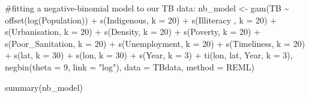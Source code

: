 \documentclass[
  letterpaper,
  DIV=11,
  numbers=noendperiod]{scrartcl}
\newenvironment{Shaded}{\begin{snugshade}}{\end{snugshade}}
\newcommand{\AttributeTok}[1]{\textcolor[rgb]{0.40,0.45,0.13}{#1}}
\newcommand{\CommentTok}[1]{\textcolor[rgb]{0.37,0.37,0.37}{#1}}
\newcommand{\DecValTok}[1]{\textcolor[rgb]{0.68,0.00,0.00}{#1}}
\newcommand{\FunctionTok}[1]{\textcolor[rgb]{0.28,0.35,0.67}{#1}}
\newcommand{\NormalTok}[1]{\textcolor[rgb]{0.00,0.23,0.31}{#1}}
\newcommand{\OtherTok}[1]{\textcolor[rgb]{0.00,0.23,0.31}{#1}}
\newcommand{\SpecialCharTok}[1]{\textcolor[rgb]{0.37,0.37,0.37}{#1}}
\newcommand{\StringTok}[1]{\textcolor[rgb]{0.13,0.47,0.30}{#1}}
\begin{document}
\begin{Shaded}
\begin{Highlighting}[]
\CommentTok{\#fitting a negative{-}binomial model to our TB data:}
\NormalTok{nb\_model }\OtherTok{\textless{}{-}} \FunctionTok{gam}\NormalTok{(TB }\SpecialCharTok{\textasciitilde{}} \FunctionTok{offset}\NormalTok{(}\FunctionTok{log}\NormalTok{(Population)) }\SpecialCharTok{+} \FunctionTok{s}\NormalTok{(Indigenous, }\AttributeTok{k =} \DecValTok{20}\NormalTok{) }\SpecialCharTok{+} \FunctionTok{s}\NormalTok{(Illiteracy , }\AttributeTok{k =} \DecValTok{20}\NormalTok{) }\SpecialCharTok{+} \FunctionTok{s}\NormalTok{(Urbanisation, }\AttributeTok{k =} \DecValTok{20}\NormalTok{) }\SpecialCharTok{+} \FunctionTok{s}\NormalTok{(Density, }\AttributeTok{k =} \DecValTok{20}\NormalTok{) }\SpecialCharTok{+} \FunctionTok{s}\NormalTok{(Poverty, }\AttributeTok{k =} \DecValTok{20}\NormalTok{) }\SpecialCharTok{+} \FunctionTok{s}\NormalTok{(Poor\_Sanitation, }\AttributeTok{k =} \DecValTok{20}\NormalTok{) }\SpecialCharTok{+} \FunctionTok{s}\NormalTok{(Unemployment, }\AttributeTok{k =} \DecValTok{20}\NormalTok{) }\SpecialCharTok{+} \FunctionTok{s}\NormalTok{(Timeliness, }\AttributeTok{k =} \DecValTok{20}\NormalTok{) }\SpecialCharTok{+} \FunctionTok{s}\NormalTok{(lat, }\AttributeTok{k =} \DecValTok{30}\NormalTok{) }\SpecialCharTok{+} \FunctionTok{s}\NormalTok{(lon, }\AttributeTok{k =} \DecValTok{30}\NormalTok{) }\SpecialCharTok{+} \FunctionTok{s}\NormalTok{(Year, }\AttributeTok{k =} \DecValTok{3}\NormalTok{) }\SpecialCharTok{+} \FunctionTok{ti}\NormalTok{(lon, lat, Year, }\AttributeTok{k =} \DecValTok{3}\NormalTok{), }\FunctionTok{negbin}\NormalTok{(}\AttributeTok{theta =} \DecValTok{9}\NormalTok{, }\AttributeTok{link =} \StringTok{"log"}\NormalTok{), }\AttributeTok{data =}\NormalTok{ TBdata, }\AttributeTok{method =} \StringTok{\textquotesingle{}REML\textquotesingle{}}\NormalTok{)}

\FunctionTok{summary}\NormalTok{(nb\_model)}
\end{Highlighting}
\end{Shaded}
\end{document}
